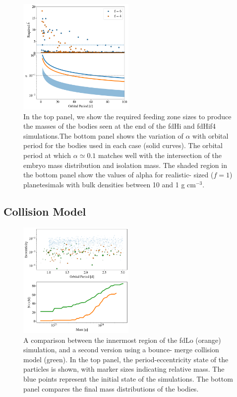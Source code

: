 \documentclass[twocolumn]{aastex63}
\begin{document}
\begin{figure}
\begin{center}
    \includegraphics[width=0.5\textwidth]{figures/f6f4_b.png}
    \caption{In the top panel, we show the required feeding zone sizes to produce the masses of the bodies seen
    at the end of the fdHi and fdHif4 simulations.The bottom panel shows the variation of $\alpha$ with orbital period for the 
    bodies used in each case (solid curves). The orbital period at which $\alpha \simeq 0.1$ matches well with the intersection of 
    the embryo mass distribution and isolation mass. The shaded region in the bottom panel show the values of alpha for realistic-
    sized ($f=1$) planetesimals with bulk densities between 10 and 1 g cm$^{-3}$.\label{fig:f6f4_b}}
\end{center}
\end{figure}

\subsection{Collision Model}

\begin{figure}
\begin{center}
    \includegraphics[width=0.5\textwidth]{figures/frag_ecc.png}
    \caption{A comparison between the innermost region of the fdLo (orange) simulation, and a second version using a bounce-
    merge collision model (green). In the top panel, the period-eccentricity state of the particles is shown, with marker sizes 
    indicating relative mass. The blue points represent the initial state of the simulations. The bottom panel compares the final 
    mass distributions of the bodies. \label{fig:frag_ecc}}
\end{center}
\end{figure}
\end{document}
